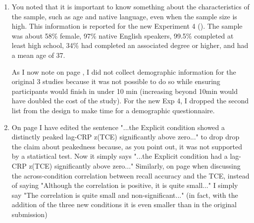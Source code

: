 \documentclass[12pt]{article}
\begin{document}
\begin{enumerate}
\item
	You noted that it is important to know something about the characteristics of the sample, such as age and native language, even when the sample size is high. This information is reported for the new Experiment 4 (\pageref{TODO-9}). The sample was about 58\% female, 97\% native English speakers, 99.5\% completed at least high school, 34\% had completed an associated degree or higher, and had a mean age of 37.

	As I now note on page \pageref{TODO-10}, I did not collect demographic information for the original 3 studies because it was not possible to do so while ensuring participants would finish in under 10 min (increasing beyond 10min would have doubled the cost of the study). For the new Exp 4, I dropped the second list from the design to make time for a demographic questionnaire. %

\item
	On page \pageref{done-11} I have edited the sentence "...the Explicit condition showed a distinctly peaked lag-CRP z(TCE) significantly above zero..." to drop drop the claim about peakedness because, as you point out, it was not supported by a statistical test. Now it simply says "...the Explicit condition had a lag-CRP z(TCE) significantly above zero..."
	Similarly, on page \pageref{done-12} when discussing the across-condition correlation between recall accuracy and the TCE, instead of saying "Although the correlation is positive, it is quite small..." I simply say "The correlation is quite small and non-significant..." (in fact, with the addition of the three new conditions it is even smaller than in the original submission)


\end{enumerate}
\end{document}
